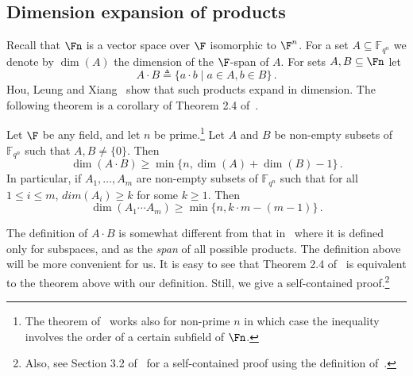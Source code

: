 \subsection{Dimension expansion of products}\label{sec:dim_exp}
Recall that $\Fn$ is a vector space
over $\F$ isomorphic to $\F^n$.
For a set $A\subseteq \mathbb{F}_{q^n}$ we denote by $\dim(A)$
the dimension of the $\F$-span of $A$.
For sets $A,B\subseteq \Fn$ let \[A\cdot B\triangleq \{a\cdot b\mid a\in A, b\in B\}\,.\]
Hou, Leung and Xiang~\cite{HLX02} show that such products expand in dimension.
 The following theorem is a corollary of Theorem 2.4 of~\cite{HLX02}.
\begin{theorem}\label{thm-hlx}
Let $\F$ be any field, and let $n$ be prime.\footnote{The theorem
of~\cite{HLX02}
works also for non-prime $n$ in which case the inequality involves
the %
order of a certain subfield of $\Fn$.}
Let $A$ and $B$ be non-empty subsets of $\mathbb{F}_{q^n}$
such that $A,B\neq \{0\}$. Then
\[\dim(A\cdot B)\geq \min\{n,\dim(A)+\dim(B) -1\}\,.\]
In particular,
if $A_1,\ldots, A_m$ are non-empty subsets of $\mathbb{F}_{q^n}$
such that for all $1\leq i \leq m $, $dim(A_i)\geq k$ for some $k\geq 1$. Then
\[\dim(A_1\cdots A_m)\geq  \min\{n,k\cdot m - (m-1)\}\,.\]

\end{theorem}
\begin{remark}
The definition of $A\cdot B$ is somewhat different from that in~\cite{HLX02} where
it is defined only for subspaces, and as the \emph{span} of all possible products.
The definition above will be more convenient for us. It is easy to see
that Theorem 2.4 of~\cite{HLX02} %
%
%
%
is equivalent to
the theorem above with our definition.
Still, we give a self-contained proof.\footnote{Also, see Section 3.2 of~\cite{DG10}
for a self-contained proof using the definition of~\cite{HLX02}.}
\end{remark}
